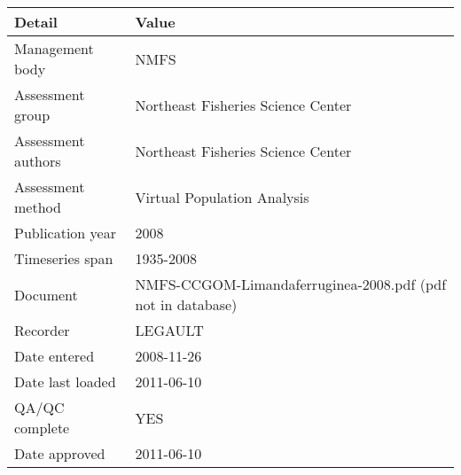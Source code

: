 \begin{table}[htb]
\centering
\begin{tabular}{lp{7cm}}
\toprule
Detail & Value \\
\midrule
Management body    & NMFS                                                        \\
Assessment group   & Northeast Fisheries Science Center                          \\
Assessment authors & Northeast Fisheries Science Center                          \\
Assessment method  & Virtual Population Analysis                                 \\
Publication year   & 2008                                                        \\
Timeseries span    & 1935-2008                                                   \\
Document           & NMFS-CCGOM-Limandaferruginea-2008.pdf (pdf not in database) \\
Recorder           & LEGAULT                                                     \\
Date entered       & 2008-11-26                                                  \\
Date last loaded   & 2011-06-10                                                  \\
QA/QC complete     & YES                                                         \\
Date approved      & 2011-06-10                                                  \\
\bottomrule
\end{tabular}
\label{tab:assessdet}
\end{table}
